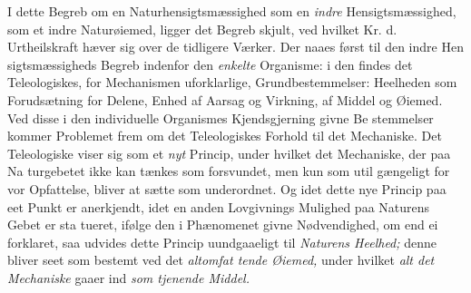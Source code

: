 I dette Begreb om en Naturhensigtsmæssighed som en
\emph{indre} Hensigtsmæssighed, som et indre Naturøiemed, ligger
det Begreb skjult, ved hvilket Kr. d. Urtheilskraft hæver sig
over de tidligere Værker. Der naaes først til den indre Hen\-%
sigtsmæssigheds Begreb indenfor den \emph{enkelte} Organisme: i
den findes det Teleologiskes, for Mechanismen uforklarlige,
Grundbestemmelser: Heelheden som Forudsætning for Delene,
Enhed af Aarsag og Virkning, af Middel og Øiemed. Ved
disse i den individuelle Organismes Kjendsgjerning givne Be\-%
stemmelser kommer Problemet frem om det Teleologiskes
Forhold til det Mechaniske. Det Teleologiske viser sig som
et \emph{nyt} Princip, under hvilket det Mechaniske, der paa Na\-%
turgebetet ikke kan tænkes som forsvundet, men kun som util\-%
gængeligt for vor Opfattelse, bliver at sætte som underordnet.
Og idet dette nye Princip paa eet Punkt er anerkjendt, idet
en anden Lovgivnings Mulighed paa Naturens Gebet er sta\-%
tueret, ifølge den i Phænomenet givne Nødvendighed, om end
ei forklaret, saa udvides dette Princip uundgaaeligt til \emph{Naturens
Heelhed;} denne bliver seet som bestemt ved det \emph{altomfat\-%
tende Øiemed,} under hvilket \emph{alt det Mechaniske} gaaer
ind \emph{som tjenende Middel.}

